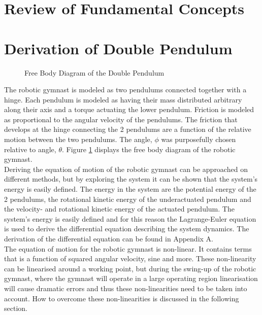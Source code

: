 \documentclass[a4paper,12pt]{article}
\begin{document}
	\section{Review of Fundamental Concepts}
	
	\section{Derivation of Double Pendulum}
	\begin{figure}
		\centering
		
		\caption{Free Body Diagram of the Double Pendulum}
		\label{fig:doublePen}
	\end{figure}

	The robotic gymnast is modeled as two pendulums connected together with a hinge. Each pendulum is modeled as having their mass distributed arbitrary along their axis and a torque actuating the lower pendulum. Friction is modeled as proportional to the angular velocity of the pendulums. The friction that develops at the hinge connecting the 2 pendulums are a function of the relative motion between the two pendulums. The angle, $\phi$ was purposefully chosen relative to angle, $\theta$. Figure \ref{fig:doublePen} displays the free body diagram of the robotic gymnast.
	\\
	
	Deriving the equation of motion of the robotic gymnast can be approached on different methods, but by exploring the system it can be shown that the system's energy is easily defined. The energy in the system are the potential energy of the 2 pendulums, the rotational kinetic energy of the underactuated pendulum and the velocity- and rotational kinetic energy of the actuated pendulum. The system's energy is easily defined and for this reason the Lagrange-Euler equation is used to derive the differential equation describing the system dynamics. The derivation of the differential equation can be found in Appendix A.
	\\
	
	The equation of motion for the robotic gymnast is non-linear. It contains terms that is a function of squared angular velocity, sine and more. These non-linearity can be linearised around a working point, but during the swing-up of the robotic gymnast, where the gymnast will operate in a large operating region linearisation will cause dramatic errors and thus these non-linearities need to be taken into account. How to overcome these non-linearities is discussed in the following section.
 
\end{document}
